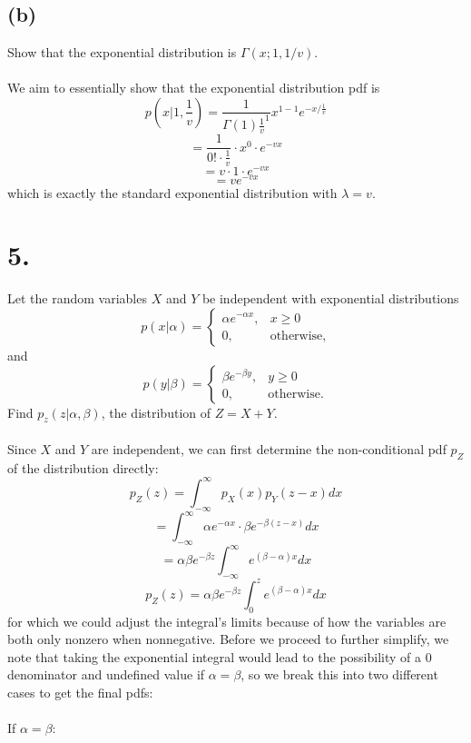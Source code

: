 \documentclass{article}
\begin{document}
{\subsection*{(b)}
Show that the exponential distribution is \(\Gamma(x; 1, 1 / v)\). \\ \\
We aim to essentially show that the exponential distribution pdf is 
\[
  p(x|1, \frac{1}{v}) = \frac{1}{\Gamma(1) \frac{1}{v}^1} x^{1 - 1} e^{-x / \frac{1}{v}}
\]
\[
  = \frac{1}{0! \cdot \frac{1}{v}} \cdot x^0 \cdot e^{-vx}
\]
\[
  = v \cdot 1 \cdot e^{-vx}
\]
\[
  = ve^{-vx}
\]
which is exactly the standard exponential distribution with \(\lambda = v\). 

}
{\Large 

\section*{5.}
Let the random variables \(X\) and \(Y\) be independent with exponential distributions
\[
  p(x | \alpha) = 
  \begin{cases}
    \alpha e^{-\alpha x}, & x \geq 0 \\
    0, & \text{otherwise,}
  \end{cases}
\]
and 
\[
  p(y | \beta) = 
  \begin{cases}
    \beta e^{-\beta y}, & y \geq 0 \\
    0, & \text{otherwise.}
  \end{cases}
\]
Find \(p_z(z | \alpha, \beta)\), the distribution of \(Z = X + Y\). \\ \\
Since \(X\) and \(Y\) are independent, we can first determine the non-conditional pdf \(p_Z\) of the distribution directly:
\[
  p_Z(z) = \int_{-\infty}^{\infty} p_X(x) p_Y (z - x) dx
\]
\[
  = \int_{-\infty}^{\infty} \alpha e^{-\alpha x} \cdot \beta e^{-\beta(z - x)} dx
\]
\[
  = \alpha \beta e^{-\beta z} \int_{-\infty}^{\infty} e^{(\beta - \alpha) x} dx
\]
\[
  p_Z(z) = \alpha \beta e^{-\beta z} \int_{0}^{z} e^{(\beta - \alpha) x} dx
\]
for which we could adjust the integral's limits because of how the variables are both only nonzero when nonnegative. Before we proceed to further simplify, we note that taking the exponential integral would lead to the possibility of a 0 denominator and undefined value if \(\alpha = \beta\), so we break this into two different cases to get the final pdfs: \\ \\
If \(\alpha = \beta\): \\
}
\end{document}

